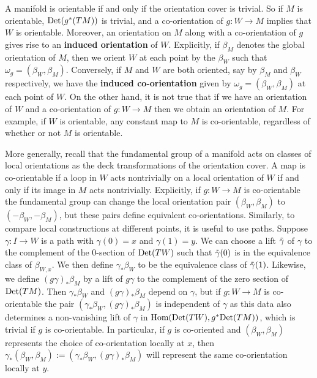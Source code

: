 A manifold is orientable if and only if the orientation  cover is trivial.  So if $M$ is orientable, ${\rm Det}(g^*(TM))$ is trivial, and  a co-orientation
of $g: W \to M$ implies that $W$ is orientable.  Moreover, an orientation on $M$ along with a co-orientation of $g$ gives rise to an \textbf{induced orientation} of $W$. Explicitly, if $\beta_M$ denotes the global orientation of $M$, then we orient $W$ at each point by the $\beta_W$ such that $\omega_g=(\beta_W,\beta_M)$. Conversely, if $M$ and $W$ are both oriented, say by $\beta_M$ and $\beta_W$ respectively, we have the \textbf{induced co-orientation} given by $\omega_g=(\beta_W,\beta_M)$ at each point of $W$.
On the other hand, it is not true that if we have an orientation of $W$ and a co-orientation of $g:W\to M$ then we obtain an orientation of $M$. For example, if $W$ is orientable, any constant map to $M$ is co-orientable, regardless of whether or not $M$ is orientable.

More generally, recall that the fundamental group
of a manifold acts on classes of local orientations as the deck transformations  of the orientation cover.
A map is co-orientable if a loop in $W$ acts nontrivially on a local orientation of $W$ if and only if
its image in $M$ acts nontrivially.  Explicitly, if $g:W\to M$ is co-orientable  the fundamental group can change the local orientation pair
$(\beta_W, \beta_M)$ to $(-\beta_W, -\beta_M)$, but these pairs define equivalent co-orientations.
Similarly, to compare local constructions at different points, it is useful to use paths. Suppose $\gamma:I\to W$ is a path with $\gamma(0)=x$ and $\gamma(1)=y$. We can choose a lift $\tilde \gamma$ of $\gamma$ to the complement of the $0$-section of ${\rm Det}(TW)$ such that $\tilde \gamma(0)$ is in the equivalence class of $\beta_{W,x}$. We then define $\gamma_*\beta_{W}$ to be the equivalence class of $\tilde \gamma(1)$. Likewise, we define $(g\gamma)_*\beta_M$ by a lift of $g\gamma$ to the complement of the zero section of ${\rm Det}(TM)$. Then  $\gamma_*\beta_{W}$ and $(g\gamma)_*\beta_M$ depend on $\gamma$, but if $g:W\to M$ is co-orientable the pair $(\gamma_*\beta_{W}, (g\gamma)_*\beta_M)$ is independent of $\gamma$ as this data also determines a non-vanishing lift of $\gamma$ in $\textup{Hom}({\rm Det}(TW),g^*{\rm Det}(TM))$, which is trivial if $g$ is co-orientable. In particular, if  $g$ is co-oriented and $(\beta_{W}, \beta_M)$ represents the choice of co-orientation locally at $x$, then $\gamma_*(\beta_W,\beta_M):=(\gamma_*\beta_{W}, (g\gamma)_*\beta_M)$ will represent the same co-orientation locally at $y$.


